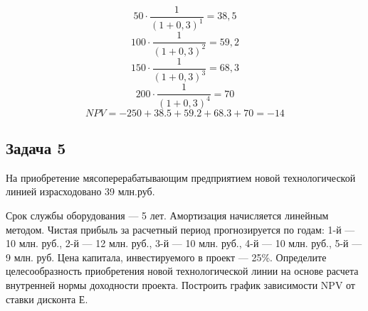 \[50 \cdot \dfrac{1}{(1+0,3)^1} = 38,5\]
\[100 \cdot \dfrac{1}{(1+0,3)^2} = 59,2\]
\[150 \cdot \dfrac{1}{(1+0,3)^3} = 68,3\]
\[200 \cdot \dfrac{1}{(1+0,3)^4} = 70\]
\[NPV = -250+38.5+59.2+68.3+70=-14\]
















\subsection{Задача 5}
На приобретение мясоперерабатывающим предприятием новой технологической линией израсходовано 39 млн.руб.

Срок службы оборудования --- 5 лет. Амортизация начисляется линейным методом. Чистая прибыль за расчетный период прогнозируется по годам: 1-й --- 10 млн. руб., 2-й --- 12 млн. руб., 3-й --- 10 млн. руб., 4-й --- 10 млн. руб., 5-й --- 9 млн. руб. Цена капитала, инвестируемого в проект --- 25\%. Определите целесообразность приобретения новой  технологической линии на основе расчета внутренней нормы доходности проекта. Построить график зависимости NPV от ставки дисконта Е.
